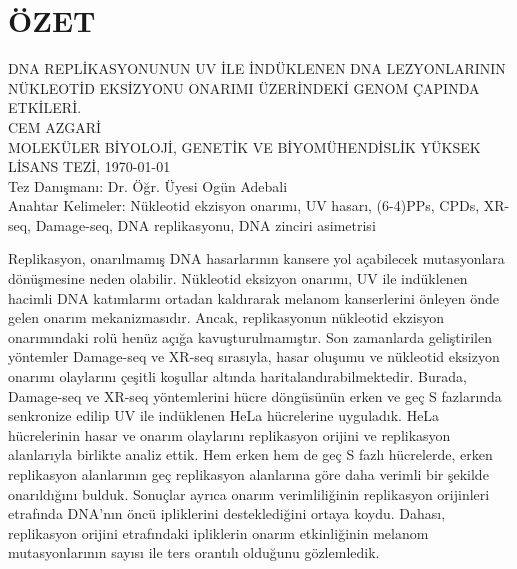 \chapter*{\vspace{-4\baselineskip} \bf ÖZET} 
\begin{otherlanguage}{turkish}
\begin{center}
\MakeUppercase{DNA REPLİKASYONUNUN UV İLE İNDÜKLENEN DNA LEZYONLARININ NÜKLEOTİD EKSİZYONU ONARIMI ÜZERİNDEKİ GENOM ÇAPINDA ETKİLERİ.} \\[3\baselineskip]
\MakeUppercase{CEM AZGARİ} \\[\baselineskip]
MOLEKÜLER BİYOLOJİ, GENETİK VE BİYOMÜHENDİSLİK YÜKSEK LİSANS TEZİ, \Cemdateformat\today \\[\baselineskip]
Tez Danışmanı: Dr. Öğr. Üyesi Ogün Adebali \\[2\baselineskip]
Anahtar Kelimeler: Nükleotid ekzisyon onarımı, UV hasarı, (6-4)PPs, CPDs, XR-seq, Damage-seq, DNA replikasyonu, DNA zinciri asimetrisi \\[2\baselineskip]
\end{center}

\singlespacing
Replikasyon, onarılmamış DNA hasarlarının kansere yol açabilecek mutasyonlara dönüşmesine neden olabilir. Nükleotid eksizyon onarımı, UV ile indüklenen hacimli DNA katımlarını ortadan kaldırarak melanom kanserlerini önleyen önde gelen onarım mekanizmasıdır. Ancak, replikasyonun nükleotid ekzisyon onarımındaki rolü henüz açığa kavuşturulmamıştır. Son zamanlarda geliştirilen yöntemler Damage-seq ve XR-seq sırasıyla, hasar oluşumu ve nükleotid eksizyon onarımı olaylarını çeşitli koşullar altında haritalandırabilmektedir. Burada, Damage-seq ve XR-seq yöntemlerini hücre döngüsünün erken ve geç S fazlarında senkronize edilip UV ile indüklenen HeLa hücrelerine uyguladık. HeLa hücrelerinin hasar ve onarım olaylarını replikasyon orijini ve replikasyon alanlarıyla birlikte analiz ettik. Hem erken hem de geç S fazlı hücrelerde, erken replikasyon alanlarının geç replikasyon alanlarına göre daha verimli bir şekilde onarıldığını bulduk. Sonuçlar ayrıca onarım verimliliğinin replikasyon orijinleri etrafında DNA'nın öncü ipliklerini desteklediğini ortaya koydu. Dahası, replikasyon orijini etrafındaki ipliklerin onarım etkinliğinin melanom mutasyonlarının sayısı ile ters orantılı olduğunu gözlemledik.

\end{otherlanguage}

\clearpage\pagebreak
\onehalfspacing